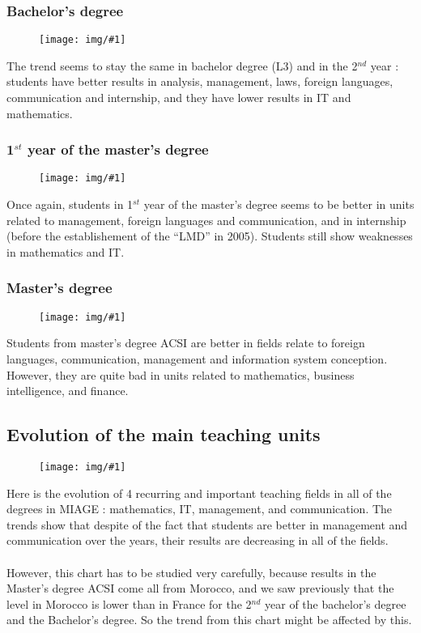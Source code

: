 \documentclass[11pt, a4paper]{article}
\newcommand\image[2]{
	\begin{figure}[H]
	\centering
	\texttt{[image: img/\#1]}
	\end{figure}
}
\begin{document}
    \subsubsection{Bachelor's degree}
    \image{image03.png}{400px}

    The trend seems to stay the same in bachelor degree (L3) and in the 2$^{nd}$ year : students have better results in analysis, management, laws, foreign languages, communication and internship, and they have lower results in IT and mathematics.

    \subsubsection{ 1$^{st}$ year of the  master's degree}

    \image{image08.png}{370px}

    Once again, students in 1$^{st}$ year of the master's degree seems to be better in units related to management, foreign languages and communication, and in internship (before the establishement of the “LMD” in 2005). Students still show weaknesses in mathematics and IT.

    \subsubsection{ Master's degree}

    \image{image14.png}{370px}

    Students from master's degree ACSI are better in fields relate to foreign languages, communication, management and information system conception. However, they are quite bad in units related to mathematics, business intelligence, and finance.

    \newpage

    \subsection{Evolution of the main teaching units}

    \image{image01.png}{\textwidth}

    Here is the evolution of 4 recurring and important teaching fields in all of the degrees in MIAGE : mathematics, IT, management, and communication. 
    The trends show that despite of the fact that students are better in management and communication over the years, their results are decreasing in all of the fields.
\\\\    However, this chart has to be studied very carefully, because results in the Master's degree ACSI come all from Morocco, and we saw previously that the level in Morocco is lower than in France for the 2$^{nd}$ year of the bachelor's degree and the Bachelor's degree. So the trend from this chart might be affected by this.
\end{document}
